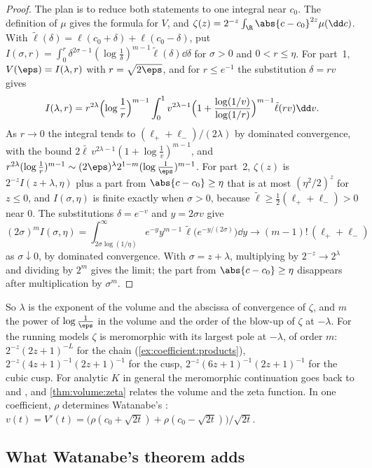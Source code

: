 \begin{refsection}
\begin{proof}
The plan is to reduce both statements to one integral near $c_0$. The definition of $\mu$ gives the formula for $V$, and $\zeta(z)=2^{-z}\int_\R\abs{c-c_0}^{2z}\mu(\dd c)$. With $\tilde\ell(\delta)=\ell(c_0+\delta)+\ell(c_0-\delta)$, put $I(\sigma,r)=\int_0^r\delta^{2\sigma-1}(\log\frac1\delta)^{m-1}\tilde\ell(\delta)\dd\delta$ for $\sigma>0$ and $0<r\le\eta$. For part~1, $V(\eps)=I(\lambda,r)$ with $r=\sqrt{2\eps}$, and for $r\le e^{-1}$ the substitution $\delta=rv$ gives
\[
I(\lambda,r)=r^{2\lambda}\Bigl(\log\frac1r\Bigr)^{m-1}\int_0^1v^{2\lambda-1}\Bigl(1+\frac{\log(1/v)}{\log(1/r)}\Bigr)^{m-1}\tilde\ell(rv)\dd v.
\]
As $r\to0$ the integral tends to $(\ell_++\ell_-)/(2\lambda)$ by dominated convergence, with the bound $2\bar\ell\,v^{2\lambda-1}(1+\log\frac1v)^{m-1}$, and $r^{2\lambda}(\log\frac1r)^{m-1}\sim(2\eps)^\lambda2^{1-m}(\log\frac1\eps)^{m-1}$. For part~2, $\zeta(z)$ is $2^{-z}I(z+\lambda,\eta)$ plus a part from $\abs{c-c_0}\ge\eta$ that is at most $(\eta^2/2)^z$ for $z\le0$, and $I(\sigma,\eta)$ is finite exactly when $\sigma>0$, because $\tilde\ell\ge\frac12(\ell_++\ell_-)>0$ near $0$. The substitutions $\delta=e^{-v}$ and $y=2\sigma v$ give
\[
(2\sigma)^mI(\sigma,\eta)=\int_{2\sigma\log(1/\eta)}^\infty e^{-y}y^{m-1}\,\tilde\ell\bigl(e^{-y/(2\sigma)}\bigr)\dd y\to(m-1)!\,(\ell_++\ell_-)
\]
as $\sigma\downarrow0$, by dominated convergence. With $\sigma=z+\lambda$, multiplying by $2^{-z}\to2^\lambda$ and dividing by $2^m$ gives the limit; the part from $\abs{c-c_0}\ge\eta$ disappears after multiplication by $\sigma^m$.
\end{proof}

So $\lambda$ is the exponent of the volume and the abscissa of convergence of $\zeta$, and $m$ the power of $\log\frac1\eps$ in the volume and the order of the blow-up of $\zeta$ at $-\lambda$. For the running models $\zeta$ is meromorphic with its largest pole at $-\lambda$, of order $m$: $2^{-z}(2z+1)^{-L}$ for the chain (\cref{ex:coefficient:products}), $2^{-z}(4z+1)^{-1}(2z+1)^{-1}$ for the cusp, $2^{-z}(6z+1)^{-1}(2z+1)^{-1}$ for the cubic cusp. For analytic $K$ in general the meromorphic continuation goes back to \textcite{BernsteinGelfand1969} and \textcite{Atiyah1970}, and \cref{thm:volume:zeta} relates the volume and the zeta function. In one coefficient, $\rho$ determines Watanabe's : $v(t)=V'(t)=\bigl(\rho(c_0+\sqrt{2t})+\rho(c_0-\sqrt{2t})\bigr)/\sqrt{2t}$.

\subsection{What Watanabe's theorem adds}\label{sec:coefficient:general}


\end{refsection}
